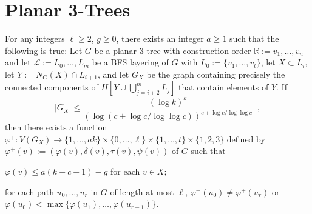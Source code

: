 \documentclass[kpfonts]{patmorin}
\theoremstyle{named}
\begin{document}
\section{Planar 3-Trees}

\begin{lem}\label{three-tree-technical}
    For any integers $\ell\ge 2$, $g\ge 0$, there exists an integer $a\ge 1$ such that the following is true:
    Let $G$ be a planar 3-tree with construction order $\mathbb{R}:=v_1,\ldots,v_n$ and let $\mathcal{L}:=L_0,\ldots,L_m$ be a BFS layering of $G$ with $L_0:=\{v_1,\ldots,v_t\}$, let $X\subset L_i$, let $Y:=N_G(X)\cap L_{i+1}$, and let $G_X$ be the graph containing precisely the connected components of $H[Y\cup\bigcup_{j=i+2}^m L_j]$ that contain elements of $Y$.  If
    \begin{equation}
        |G_X| \le \frac{(\log k)^k}{(\log(c+\log c/\log\log c))^{c+\log c/\log\log c}}
        \enspace , \label{input-size}
    \end{equation}
    then there exists a function $\varphi^+:V(G_X)\to\{1,\ldots,ak\}\times\{0,\ldots,\ell\}\times\{1,\ldots,t\}\times\{1,2,3\}$ defined by $\varphi^+(v):=(\varphi(v),\delta(v),\tau(v),\psi(v))$ of $G$ such that
    \begin{compactenum}
        \item $\varphi(v) \le a(k-c-1)-g$ for each $v\in X$;
        \item for each path $u_0,\ldots,u_r$ in $G$ of length at most $\ell$, $\varphi^+(u_0)\neq\varphi^+(u_r)$ or $\varphi(u_0)<\max\{\varphi(u_1),\ldots,\varphi(u_{r-1})\}$.
    \end{compactenum}
\end{lem}
\end{document}
